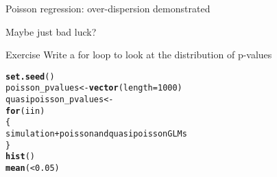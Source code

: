 \documentclass[10pt]{beamer}\usepackage[]{graphicx}\usepackage[]{color}
\makeatletter
\newcommand{\hlkwd}[1]{\textcolor[rgb]{0.737,0.353,0.396}{\textbf{#1}}}%
\newenvironment{kframe}{%
 \def\at@end@of@kframe{}%
 \ifinner\ifhmode%
  \def\at@end@of@kframe{\end{minipage}}%
  \begin{minipage}{\columnwidth}%
 \fi\fi%
 \def\FrameCommand##1{\hskip\@totalleftmargin \hskip-\fboxsep
 \colorbox{shadecolor}{##1}\hskip-\fboxsep
     \hskip-\linewidth \hskip-\@totalleftmargin \hskip\columnwidth}%
 \MakeFramed {\advance\hsize-\width
   \@totalleftmargin\z@ \linewidth\hsize
   \@setminipage}}%
 {\par\unskip\endMakeFramed%
 \at@end@of@kframe}
\newenvironment{knitrout}{}{} %
\makeatother
\begin{document}
\begin{frame}[fragile]{Poisson regression: over-dispersion demonstrated}


 Maybe just bad luck?
\begin{exampleblock}{Exercise}
  Write a for loop to look at the distribution of p-values
\end{exampleblock}

\begin{knitrout}\small
{}\color{fgcolor}\begin{kframe}
\begin{alltt}
    \hlkwd{set.seed}( )
    poisson_pvalues <- \hlkwd{vector}(length = 1000)
    quasipoisson_pvalues <-
    \hlkwd{for}(i in  )
    \{
      simulation + poisson and quasipoisson GLMs
    \}
    \hlkwd{hist}( )
    \hlkwd{mean}( <0.05)
\end{alltt}
\end{kframe}
\end{knitrout}

% 
% 
% 

\end{frame}
\end{document}
